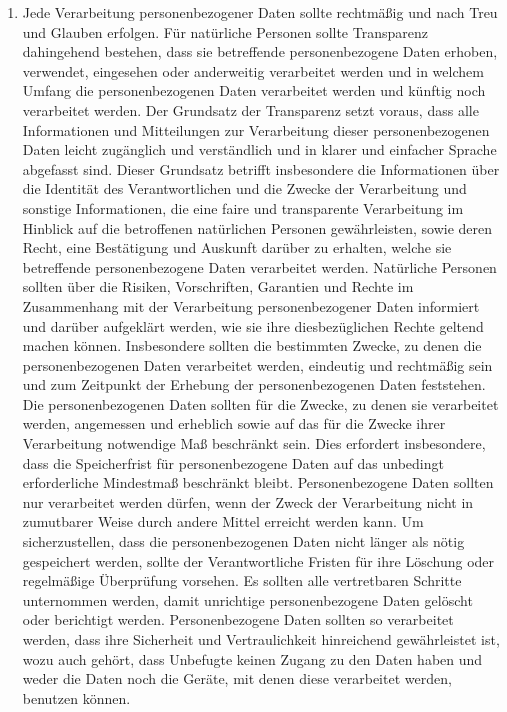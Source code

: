\begin{enumerate}
   \item Jede Verarbeitung personenbezogener Daten sollte rechtmäßig und nach Treu und Glauben erfolgen. Für natürliche
    Personen sollte Transparenz dahingehend bestehen, dass sie betreffende personenbezogene Daten erhoben, verwendet,
    eingesehen oder anderweitig verarbeitet werden und in welchem Umfang die personenbezogenen Daten verarbeitet werden
    und künftig noch verarbeitet werden. Der Grundsatz der Transparenz setzt voraus, dass alle Informationen und
    Mitteilungen zur Verarbeitung dieser personenbezogenen Daten leicht zugänglich und verständlich und in klarer und
    einfacher Sprache abgefasst sind. Dieser Grundsatz betrifft insbesondere die Informationen über die Identität des
    Verantwortlichen und die Zwecke der Verarbeitung und sonstige Informationen, die eine faire und transparente
    Verarbeitung im Hinblick auf die betroffenen natürlichen Personen gewährleisten, sowie deren Recht, eine
    Bestätigung und Auskunft darüber zu erhalten, welche sie betreffende personenbezogene Daten verarbeitet werden.
    Natürliche Personen sollten über die Risiken, Vorschriften, Garantien und Rechte im Zusammenhang mit der
    Verarbeitung personenbezogener Daten informiert und darüber aufgeklärt werden, wie sie ihre diesbezüglichen Rechte
    geltend machen können. Insbesondere sollten die bestimmten Zwecke, zu denen die personenbezogenen Daten verarbeitet
    werden, eindeutig und rechtmäßig sein und zum Zeitpunkt der Erhebung der personenbezogenen Daten feststehen. Die
    personenbezogenen Daten sollten für die Zwecke, zu denen sie verarbeitet werden, angemessen und erheblich sowie auf
    das für die Zwecke ihrer Verarbeitung notwendige Maß beschränkt sein. Dies erfordert insbesondere, dass die
    Speicherfrist für personenbezogene Daten auf das unbedingt erforderliche Mindestmaß beschränkt bleibt.
    Personenbezogene Daten sollten nur verarbeitet werden dürfen, wenn der Zweck der Verarbeitung nicht in zumutbarer
    Weise durch andere Mittel erreicht werden kann. Um sicherzustellen, dass die personenbezogenen Daten nicht länger
    als nötig gespeichert werden, sollte der Verantwortliche Fristen für ihre Löschung oder regelmäßige Überprüfung
    vorsehen. Es sollten alle vertretbaren Schritte unternommen werden, damit unrichtige personenbezogene Daten
    gelöscht oder berichtigt werden. Personenbezogene Daten sollten so verarbeitet werden, dass ihre Sicherheit und
    Vertraulichkeit hinreichend gewährleistet ist, wozu auch gehört, dass Unbefugte keinen Zugang zu den Daten haben
    und weder die Daten noch die Geräte, mit denen diese verarbeitet werden, benutzen können.%
   \label{itm:eg-39}
   

\end{enumerate}
